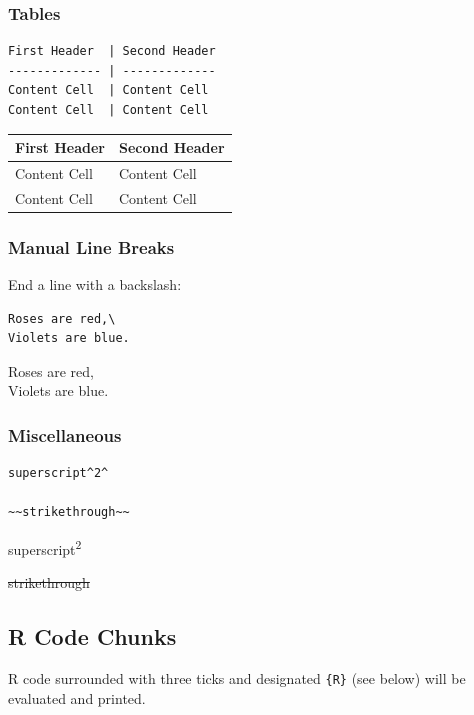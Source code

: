 \documentclass[]{book}
\begin{document}
\hypertarget{tables}{%
\subsubsection{Tables}\label{tables}}

\begin{verbatim}
First Header  | Second Header
------------- | -------------
Content Cell  | Content Cell
Content Cell  | Content Cell
\end{verbatim}

\begin{longtable}[]{@{}ll@{}}
\toprule
First Header & Second Header\tabularnewline
\midrule
\endhead
Content Cell & Content Cell\tabularnewline
Content Cell & Content Cell\tabularnewline
\bottomrule
\end{longtable}

\hypertarget{manual-line-breaks}{%
\subsubsection{Manual Line Breaks}\label{manual-line-breaks}}

End a line with a backslash:

\begin{verbatim}
Roses are red,\
Violets are blue.
\end{verbatim}

Roses are red,\\
Violets are blue.

\hypertarget{miscellaneous}{%
\subsubsection{Miscellaneous}\label{miscellaneous}}

\begin{verbatim}
superscript^2^

~~strikethrough~~
\end{verbatim}

superscript\textsuperscript{2}

\sout{strikethrough}

\hypertarget{r-code-chunks}{%
\subsection{R Code Chunks}\label{r-code-chunks}}

R code surrounded with three ticks and designated \texttt{\{R\}} (see below) will be evaluated and printed.
\end{document}
